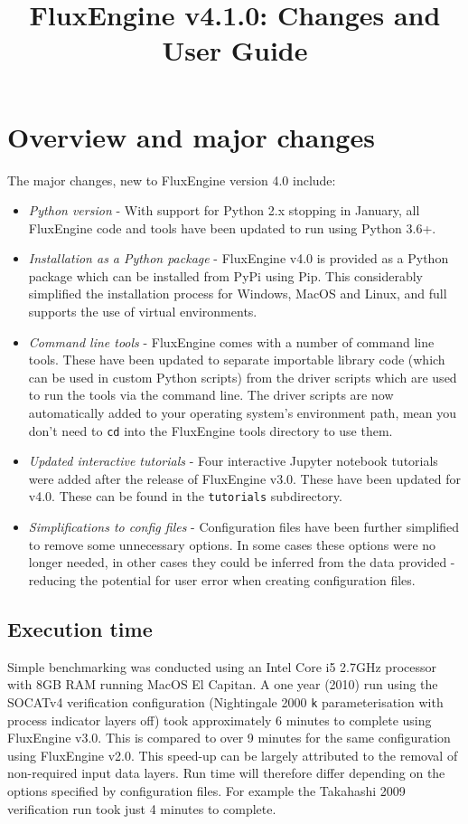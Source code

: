 \documentclass[]{scrartcl}
\title{FluxEngine v4.1.0: Changes and User Guide}
\begin{document}
\maketitle
\tableofcontents
\sloppy %

\section{Overview and major changes}
The major changes, new to FluxEngine version 4.0 include:
\begin{itemize}
	\item \textit{Python version} - With support for Python 2.x stopping in January, all FluxEngine code and tools have been updated to run using Python 3.6+.
	\item \textit{Installation as a Python package} - FluxEngine v4.0 is provided as a Python package which can be installed from PyPi using Pip. This considerably simplified the installation process for Windows, MacOS and Linux, and full supports the use of virtual environments.
	\item \textit{Command line tools} - FluxEngine comes with a number of command line tools. These have been updated to separate importable library code (which can be used in custom Python scripts) from the driver scripts which are used to run the tools via the command line. The driver scripts are now automatically added to your operating system's environment path, mean you don't need to \texttt{cd} into the FluxEngine tools directory to use them.
	\item \textit{Updated interactive tutorials} - Four interactive Jupyter notebook tutorials were added after the release of FluxEngine v3.0. These have been updated for v4.0. These can be found in the \texttt{tutorials} subdirectory.
	\item \textit{Simplifications to config files} - Configuration files have been further simplified to remove some unnecessary options. In some cases these options were no longer needed, in other cases they could be inferred from the data provided - reducing the potential for user error when creating configuration files.
\end{itemize}

\subsection{Execution time}
Simple benchmarking was conducted using an Intel Core i5 2.7GHz processor with 8GB RAM running MacOS El Capitan. A one year (2010) run using the SOCATv4 verification configuration (Nightingale 2000 \texttt{k} parameterisation with process indicator layers off) took approximately 6 minutes to complete using FluxEngine v3.0. This is compared to over 9 minutes for the same configuration using FluxEngine v2.0. This speed-up can be largely attributed to the removal of non-required input data layers. Run time will therefore differ depending on the options specified by configuration files. For example the Takahashi 2009 verification run took just 4 minutes to complete.
\end{document}
